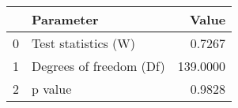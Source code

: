 \begin{tabular}{llr}
\toprule
{} &                Parameter &     Value \\
\midrule
0 &      Test statistics (W) &    0.7267 \\
1 &  Degrees of freedom (Df) &  139.0000 \\
2 &                  p value &    0.9828 \\
\bottomrule
\end{tabular}
